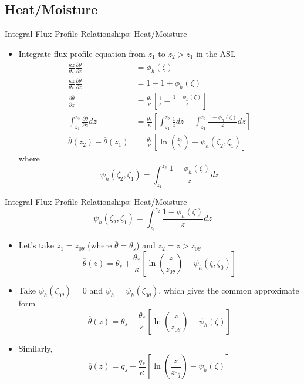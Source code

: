 \subsection{Heat/Moisture}
\begin{frame}{Integral Flux-Profile Relationships: Heat/Moisture}
\begin{itemize}
	\item Integrate flux-profile equation from $z_1$ to $z_2>z_1$ in the ASL
	\begin{align*}
		\frac{\kappa z}{\theta_*} \frac{\partial \overline{\theta}}{\partial z} &= \phi_h(\zeta)\\
		\frac{\kappa z}{\theta_*} \frac{\partial \overline{\theta}}{\partial z} &= 1 -1 + \phi_h(\zeta)\\
		\frac{\partial \overline{\theta}}{\partial z} &= \frac{\theta_*}{\kappa}\left[ \frac{1}{z} - \frac{1-\phi_h(\zeta)}{z}\right]\\
		\int^{z_2}_{z_1} \frac{\partial \overline{\theta}}{\partial z} dz &= \frac{\theta_*}{\kappa} \left[ \int^{z_2}_{z_1} \frac{1}{z} dz - \int^{z_2}_{z_1} \frac{1-\phi_h(\zeta)}{z} dz \right]\\
		\overline{\theta}(z_2) - \overline{\theta}(z_1) &= \frac{\theta_*}{\kappa}\left[\ln\left(\frac{z_2}{z_1}\right) - \psi_h\left(\zeta_2, \zeta_1\right)\right]
	\end{align*}
	where $$\psi_h\left(\zeta_2, \zeta_1\right) = \int^{z_2}_{z_1} \frac{1-\phi_h(\zeta)}{z} dz$$
\end{itemize}
\end{frame}
\begin{frame}{Integral Flux-Profile Relationships: Heat/Moisture}
$$\psi_h\left(\zeta_2, \zeta_1\right) = \int^{z_2}_{z_1} \frac{1-\phi_h(\zeta)}{z} dz$$
\begin{itemize}
	\item Let's take $z_1=z_{0\theta}$ (where $\overline{\theta}=\theta_s$) and $z_2=z>z_{0\theta}$
	$$\overline{\theta}(z) = \theta_s + \frac{\theta_*}{\kappa}\left[\ln\left(\frac{z}{z_{0\theta}}\right) - \psi_h\left(\zeta, \zeta_0\right)\right]$$
	\item Take $\psi_h(\zeta_{0\theta}) = 0$ and $\psi_h = \psi_h(\zeta_{0\theta})$, which gives the common approximate form
	$$\boxed{\overline{\theta}(z) = \theta_s + \frac{\theta_*}{\kappa}\left[\ln\left(\frac{z}{z_{0\theta}}\right) - \psi_h(\zeta)\right]}$$
	\item Similarly,
	$$\boxed{\overline{q}(z) = q_s + \frac{q_*}{\kappa}\left[\ln\left(\frac{z}{z_{0q}}\right) - \psi_h(\zeta)\right]}$$
\end{itemize}
\end{frame}
